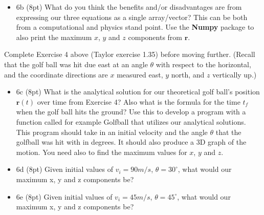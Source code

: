 \documentclass[11pt]{article}
\providecommand{\tightlist}{%
      \setlength{\itemsep}{0pt}\setlength{\parskip}{0pt}}
\begin{document}
    \begin{itemize}
\tightlist
\item
  6b (8pt) What do you think the benefits and/or disadvantages are from
  expressing our three equations as a single array/vector? This can be
  both from a computational and physics stand point. Use the
  \textbf{Numpy} package to also print the maximum \(x\), \(y\) and
  \(z\) components from \(\boldsymbol{r}\).
\end{itemize}

Complete Exercise 4 above (Taylor exercise 1.35) before moving further.
(Recall that the golf ball was hit due east at an angle \(\theta\) with
respect to the horizontal, and the coordinate directions are \(x\)
measured east, \(y\) north, and \(z\) vertically up.)

\begin{itemize}
\item
  6c (8pt) What is the analytical solution for our theoretical golf
  ball's position \(\boldsymbol{r}(t)\) over time from Exercise 4? Also
  what is the formula for the time \(t_f\) when the golf ball hits the
  ground? Use this to develop a program with a function called for
  example Golfball that utilizes our analytical solutions. This program
  should take in an initial velocity and the angle \(\theta\) that the
  golfball was hit with in degrees. It should also produce a 3D graph of
  the motion. You need also to find the maximum values for \(x\), \(y\)
  and \(z\).
\item
  6d (8pt) Given initial values of \(v_i = 90 m/s\),
  \(\theta = 30^{\circ}\), what would our maximum x, y and z components
  be?
\item
  6e (8pt) Given initial values of \(v_i = 45 m/s\),
  \(\theta = 45^{\circ}\), what would our maximum x, y and z components
  be?
\end{itemize}


    
    
    
\end{document}
